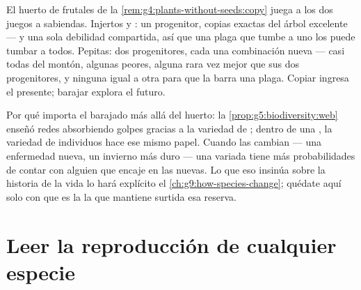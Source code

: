 \begin{example}\label{ex:g8:sexual-reproduction:bets}
El huerto de frutales de la \cref{rem:g4:plants-without-seeds:copy}
juega a los dos juegos a sabiendas. Injertos y : un progenitor,
copias exactas del árbol excelente --- y una sola debilidad compartida,
así que una plaga que tumbe a uno los puede tumbar a todos. Pepitas:
dos progenitores, cada  una combinación nueva --- casi todas
del montón, algunas peores, alguna rara vez mejor que sus dos
progenitores, y ninguna igual a otra para que la barra una plaga.
Copiar ingresa el presente; barajar explora el futuro.
\end{example}

\begin{remark}\label{rem:g8:sexual-reproduction:reserve}
Por qué importa el barajado más allá del huerto: la
\cref{prop:g5:biodiversity:web} enseñó redes absorbiendo golpes gracias
a la variedad de ; dentro de una , la variedad de
individuos hace ese mismo papel. Cuando las  cambian --- una
enfermedad nueva, un invierno más duro --- una  variada tiene
más probabilidades de contar con alguien que encaje en las 
nuevas. Lo que eso insinúa sobre la historia de la vida lo hará
explícito el \cref{ch:g9:how-species-change}; quédate aquí solo con que
es la  la que mantiene surtida esa reserva.
\end{remark}

\section{Leer la reproducción de cualquier especie}

